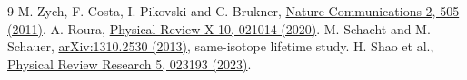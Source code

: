 \documentclass[11pt,a4paper]{article}
\begin{document}
\begin{thebibliography}{9}\small
{} M. Zych, F. Costa, I. Pikovski and C. Brukner,
\href{https://doi.org/10.1038/ncomms1498}{Nature Communications 2, 505 (2011)}.
 A. Roura,
\href{https://doi.org/10.1103/PhysRevX.10.021014}{Physical Review X 10, 021014 (2020)}.
 M. Schacht and M. Schauer,
\href{https://arxiv.org/abs/1310.2530}{arXiv:1310.2530 (2013)}, same-isotope lifetime study.
 H. Shao et al.,
\href{https://doi.org/10.1103/PhysRevResearch.5.023193}{Physical Review Research 5, 023193 (2023)}.
\end{thebibliography}
\end{document}

